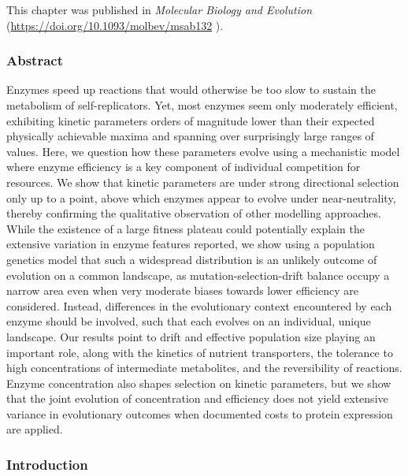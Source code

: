 This chapter was published in \textit{Molecular Biology and Evolution} (\url{https://doi.org/10.1093/molbev/msab132} ).

\subsubsection{Abstract}

Enzymes speed up reactions that would otherwise be too slow to sustain the metabolism of self-replicators. 
Yet, most enzymes seem only moderately efficient, exhibiting kinetic parameters orders of magnitude lower than their expected physically achievable maxima and spanning over surprisingly large ranges of values. Here, we question how these parameters evolve using a mechanistic model where enzyme efficiency is a key component of individual competition for resources. We show that kinetic parameters are under strong directional selection only up to a point, above which enzymes appear to evolve under near-neutrality, thereby confirming the qualitative observation of other modelling approaches. 
While the existence of a large fitness plateau could potentially explain the extensive variation in enzyme features reported, we show using a population genetics model that such a widespread distribution is an unlikely outcome of evolution on a common landscape, as mutation-selection-drift balance occupy a narrow area even when very moderate biases towards lower efficiency are considered. Instead, differences in the evolutionary context encountered by each enzyme should be involved, such that each evolves on an individual, unique landscape. Our results point to drift and effective population size playing an important role, along with the kinetics of nutrient transporters, the tolerance to high concentrations of intermediate metabolites, and the reversibility of reactions. Enzyme concentration also shapes selection on kinetic parameters, but we show that the joint evolution of concentration and efficiency does not yield extensive variance in evolutionary outcomes when documented costs to protein expression are applied.



\subsubsection{{Introduction}\label{sec:Intro}}


